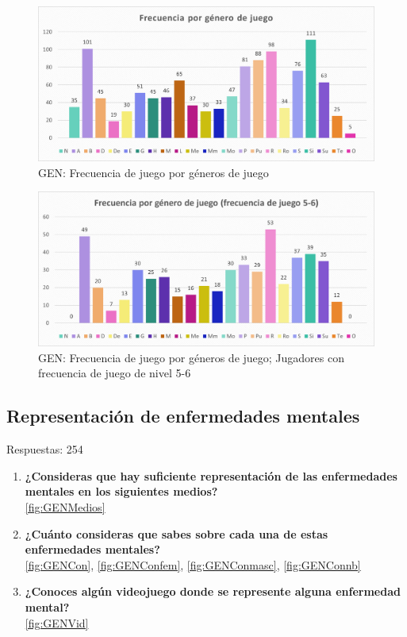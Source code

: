 \documentclass[12pt, a4paper,twoside,titlepage]{book}
\begin{document}
\begin{figure}
    \centering
    \includegraphics[width=1\linewidth]{ANEXO Gen/7AnexGENFrecgen}
    \caption{GEN: Frecuencia de juego por géneros de juego}
    \label{fig:GENFrecgen}
\end{figure}


\begin{figure}
    \centering
    \includegraphics[width=1\linewidth]{ANEXO Gen/8AnexGENFrecgen56}
    \caption{GEN: Frecuencia de juego por géneros de juego; Jugadores con frecuencia de juego de nivel 5-6}
\end{figure}



\subsection{Representación de enfermedades mentales}
Respuestas: 254
\begin{enumerate}[label=\textbf{\arabic*}.]
     \item \textbf{¿Consideras que hay suficiente representación de las enfermedades mentales en los siguientes medios?} \\
     \ref{fig:GENMedios}
     \item \textbf{¿Cuánto consideras que sabes sobre cada una de estas enfermedades mentales? }\\
     \ref{fig:GENCon}, \ref{fig:GENConfem}, \ref{fig:GENConmasc}, \ref{fig:GENConnb}
     \item \textbf{¿Conoces algún videojuego donde se represente alguna enfermedad mental? }\\
     \ref{fig:GENVid}
\end{enumerate}
\end{document}
